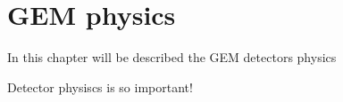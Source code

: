 \documentclass[]{book}
\begin{document}
\chapter{GEM physics}

In this chapter will be described the GEM detectors physics

Detector physiscs is so important!
\end{document}

